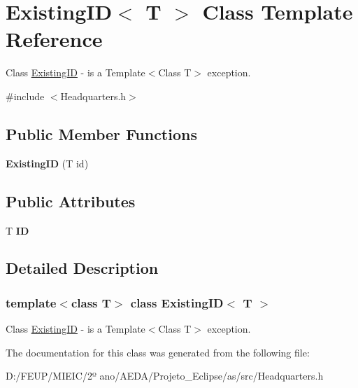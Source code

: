 \hypertarget{class_existing_i_d}{}\section{Existing\+ID$<$ T $>$ Class Template Reference}
\label{class_existing_i_d}


Class \hyperlink{class_existing_i_d}{Existing\+ID} -\/ is a Template$<$\+Class T$>$ exception.  




{\ttfamily \#include $<$Headquarters.\+h$>$}

\subsection*{Public Member Functions}
\begin{DoxyCompactItemize}
\item 
\mbox{\label{class_existing_i_d_a41a86a01eb31c91bec02239cdf7f40f9}} 
{\bfseries Existing\+ID} (T id)
\end{DoxyCompactItemize}
\subsection*{Public Attributes}
\begin{DoxyCompactItemize}
\item 
\mbox{\label{class_existing_i_d_aabb0b3d64f2384c507e13ec357f32365}} 
T {\bfseries ID}
\end{DoxyCompactItemize}


\subsection{Detailed Description}
\subsubsection*{template$<$class T$>$\newline
class Existing\+I\+D$<$ T $>$}

Class \hyperlink{class_existing_i_d}{Existing\+ID} -\/ is a Template$<$\+Class T$>$ exception. 

The documentation for this class was generated from the following file\+:\begin{DoxyCompactItemize}
\item 
D\+:/\+F\+E\+U\+P/\+M\+I\+E\+I\+C/2º ano/\+A\+E\+D\+A/\+Projeto\+\_\+\+Eclipse/as/src/Headquarters.\+h\end{DoxyCompactItemize}
